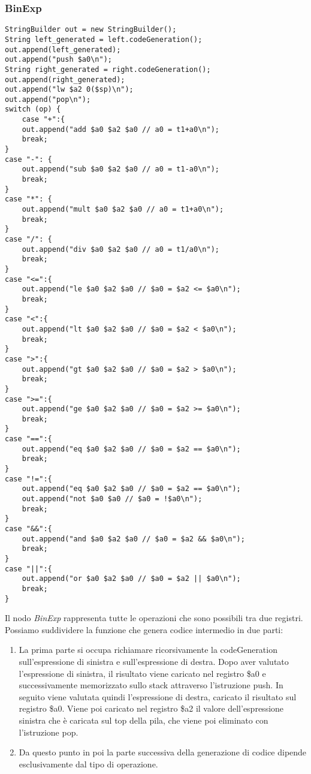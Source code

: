 \documentclass[12pt,twoside,openright,a4paper]{report}
\begin{document}
\subsubsection{BinExp}
\begin{lstlisting}
StringBuilder out = new StringBuilder();
String left_generated = left.codeGeneration(); 
out.append(left_generated);
out.append("push $a0\n");
String right_generated = right.codeGeneration(); 
out.append(right_generated);
out.append("lw $a2 0($sp)\n"); 
out.append("pop\n"); 
switch (op) {
	case "+":{
	out.append("add $a0 $a2 $a0 // a0 = t1+a0\n");
	break;
}
case "-": {
	out.append("sub $a0 $a2 $a0 // a0 = t1-a0\n");
	break;
}
case "*": {
    out.append("mult $a0 $a2 $a0 // a0 = t1+a0\n");
	break;
}
case "/": {
	out.append("div $a0 $a2 $a0 // a0 = t1/a0\n");
	break;
}
case "<=":{
	out.append("le $a0 $a2 $a0 // $a0 = $a2 <= $a0\n");
	break;
}
case "<":{
	out.append("lt $a0 $a2 $a0 // $a0 = $a2 < $a0\n");
	break;
}
case ">":{
	out.append("gt $a0 $a2 $a0 // $a0 = $a2 > $a0\n");
	break;
}
case ">=":{
	out.append("ge $a0 $a2 $a0 // $a0 = $a2 >= $a0\n");
	break;
}
case "==":{
	out.append("eq $a0 $a2 $a0 // $a0 = $a2 == $a0\n");
	break;
}
case "!=":{
	out.append("eq $a0 $a2 $a0 // $a0 = $a2 == $a0\n");
	out.append("not $a0 $a0 // $a0 = !$a0\n");
	break;
}
case "&&":{
	out.append("and $a0 $a2 $a0 // $a0 = $a2 && $a0\n");
	break;
}
case "||":{
	out.append("or $a0 $a2 $a0 // $a0 = $a2 || $a0\n");
	break;
}
\end{lstlisting}
Il nodo \textit{BinExp} rappresenta tutte le operazioni che sono possibili tra due registri. Possiamo suddividere la funzione che genera codice intermedio in due parti:
\begin{enumerate}
    \item La prima parte si occupa richiamare ricorsivamente la codeGeneration sull'espressione di sinistra e sull'espressione di destra. \newline Dopo aver valutato l'espressione di sinistra, il risultato viene caricato nel registro \$a0 e successivamente memorizzato sullo stack attraverso l'istruzione push. In seguito viene valutata quindi l'espressione di destra, caricato il risultato sul registro \$a0. Viene poi caricato nel registro \$a2 il valore dell'espressione sinistra che è caricata sul top della pila, che viene poi eliminato con l'istruzione pop.
    \item Da questo punto in poi la parte successiva della generazione di codice dipende esclusivamente dal tipo di operazione. 
\end{enumerate}
\end{document}
